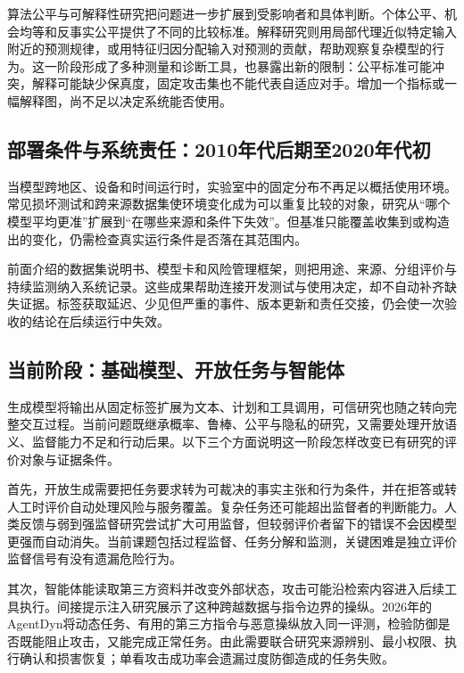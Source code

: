 算法公平与可解释性研究把问题进一步扩展到受影响者和具体判断。个体公平、机会均等和反事实公平提供了不同的比较标准。解释研究则用局部代理近似特定输入附近的预测规律，或用特征归因分配输入对预测的贡献，帮助观察复杂模型的行为。这一阶段形成了多种测量和诊断工具，也暴露出新的限制：公平标准可能冲突，解释可能缺少保真度，固定攻击集也不能代表自适应对手。增加一个指标或一幅解释图，尚不足以决定系统能否使用。

\subsection{部署条件与系统责任：2010年代后期至2020年代初}

当模型跨地区、设备和时间运行时，实验室中的固定分布不再足以概括使用环境。常见损坏测试和跨来源数据集使环境变化成为可以重复比较的对象，研究从“哪个模型平均更准”扩展到“在哪些来源和条件下失效”。但基准只能覆盖收集到或构造出的变化，仍需检查真实运行条件是否落在其范围内。

前面介绍的数据集说明书、模型卡和风险管理框架，则把用途、来源、分组评价与持续监测纳入系统记录。这些成果帮助连接开发测试与使用决定，却不自动补齐缺失证据。标签获取延迟、少见但严重的事件、版本更新和责任交接，仍会使一次验收的结论在后续运行中失效。

\subsection{当前阶段：基础模型、开放任务与智能体}

生成模型将输出从固定标签扩展为文本、计划和工具调用，可信研究也随之转向完整交互过程。当前问题既继承概率、鲁棒、公平与隐私的研究，又需要处理开放语义、监督能力不足和行动后果。以下三个方面说明这一阶段怎样改变已有研究的评价对象与证据条件。

首先，开放生成需要把任务要求转为可裁决的事实主张和行为条件，并在拒答或转人工时评价自动处理风险与服务覆盖。复杂任务还可能超出监督者的判断能力。人类反馈与弱到强监督研究尝试扩大可用监督，但较弱评价者留下的错误不会因模型更强而自动消失。当前课题包括过程监督、任务分解和监测，关键困难是独立评价监督信号有没有遗漏危险行为。

其次，智能体能读取第三方资料并改变外部状态，攻击可能沿检索内容进入后续工具执行。间接提示注入研究展示了这种跨越数据与指令边界的操纵。2026年的AgentDyn将动态任务、有用的第三方指令与恶意操纵放入同一评测，检验防御是否既能阻止攻击，又能完成正常任务。由此需要联合研究来源辨别、最小权限、执行确认和损害恢复；单看攻击成功率会遗漏过度防御造成的任务失败。


